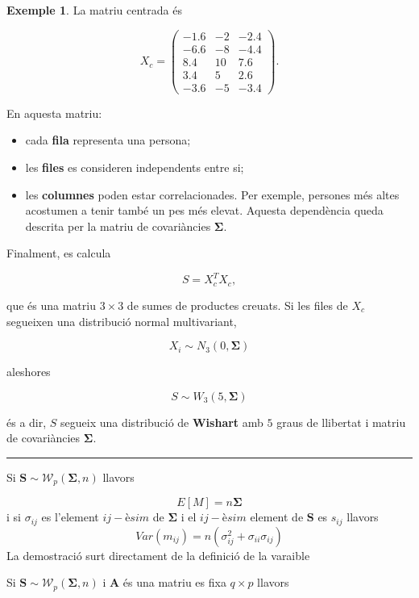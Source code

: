 \documentclass[
  catalan,
]{article}
\providecommand{\tightlist}{%
  \setlength{\itemsep}{0pt}\setlength{\parskip}{0pt}}
\theoremstyle{definition}
\theoremstyle{definition}
\newtheorem{example}{Exemple}[section]
\theoremstyle{definition}
\theoremstyle{definition}
\theoremstyle{remark}
\begin{document}
\begin{example}
La matriu centrada és

\[
X_c=
\begin{pmatrix}
-1.6 & -2 & -2.4\\
-6.6 & -8 & -4.4\\
8.4 & 10 & 7.6\\
3.4 & 5 & 2.6\\
-3.6 & -5 & -3.4
\end{pmatrix}.
\]

En aquesta matriu:

\begin{itemize}
\tightlist
\item
  cada \textbf{fila} representa una persona;
\item
  les \textbf{files} es consideren independents entre si;
\item
  les \textbf{columnes} poden estar correlacionades. Per exemple, persones més altes acostumen a tenir també un pes més elevat. Aquesta dependència queda descrita per la matriu de covariàncies \(\boldsymbol{\Sigma}\).
\end{itemize}

Finalment, es calcula

\[
S = X_c^{T}X_c,
\]

que és una matriu \(3 \times 3\) de sumes de productes creuats. Si les files de \(X_c\) segueixen una distribució normal multivariant,

\[
X_i \sim N_3(0,\boldsymbol{\Sigma})
\]

aleshores

\[
S \sim W_3(5,\boldsymbol{\Sigma})
\]

és a dir, \(S\) segueix una distribució de \textbf{Wishart} amb \(5\) graus de llibertat i matriu de covariàncies \(\boldsymbol{\Sigma}\).
\end{example}

\begin{center}\rule{0.5\linewidth}{0.5pt}\end{center}

Si \(\mathbf{S} \sim \mathcal{W}_p(\boldsymbol{\Sigma}, n)\) llavors

\[
E[M]=n\boldsymbol{\Sigma}
\]
i si \(\sigma_{ij}\) es l'element \(ij-èsim\) de \(\boldsymbol{\Sigma}\) i el \(ij-èsim\) element de \(\mathbf{S}\) es \(s_{ij}\) llavors
\[
Var(m_{ij})=n(\sigma_{ij}^2+\sigma_{ii}\sigma_{ij})
\]
La demostració surt directament de la definició de la varaible

Si \(\mathbf{S} \sim \mathcal{W}_p(\boldsymbol{\Sigma}, n)\) i \(\mathbf{A}\) és una matriu es fixa \(q \times p\) llavors
\end{document}
